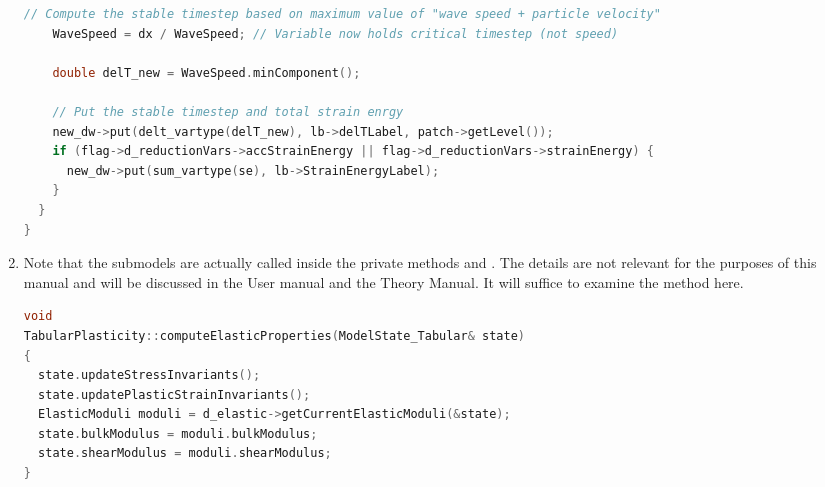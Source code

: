 \begin{enumerate}
\begin{lstlisting}[language=Cpp]
    // Compute the stable timestep based on maximum value of "wave speed + particle velocity"
    WaveSpeed = dx / WaveSpeed; // Variable now holds critical timestep (not speed)

    double delT_new = WaveSpeed.minComponent();

    // Put the stable timestep and total strain enrgy
    new_dw->put(delt_vartype(delT_new), lb->delTLabel, patch->getLevel());
    if (flag->d_reductionVars->accStrainEnergy || flag->d_reductionVars->strainEnergy) {
      new_dw->put(sum_vartype(se), lb->StrainEnergyLabel);
    }
  }
} 
\end{lstlisting}
  \item Note that the submodels are actually called inside the private methods
         and .
        The details are not relevant for the purposes of this manual and will be
        discussed in the \Vaango User manual and the \Vaango Theory Manual.  It
        will suffice to examine the  method here.
\begin{lstlisting}[language=Cpp]
void
TabularPlasticity::computeElasticProperties(ModelState_Tabular& state)
{
  state.updateStressInvariants();
  state.updatePlasticStrainInvariants();
  ElasticModuli moduli = d_elastic->getCurrentElasticModuli(&state);
  state.bulkModulus = moduli.bulkModulus;
  state.shearModulus = moduli.shearModulus;
}
\end{lstlisting}
\end{enumerate}

